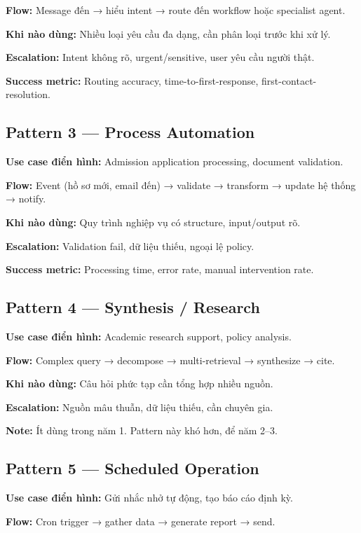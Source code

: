 \documentclass[11pt,a4paper]{article}
\begin{document}
\textbf{Flow:} Message đến → hiểu intent → route đến workflow hoặc specialist agent.

\textbf{Khi nào dùng:} Nhiều loại yêu cầu đa dạng, cần phân loại trước khi xử lý.

\textbf{Escalation:} Intent không rõ, urgent/sensitive, user yêu cầu người thật.

\textbf{Success metric:} Routing accuracy, time-to-first-response, first-contact-resolution.

\subsection{Pattern 3 — Process Automation}

\textbf{Use case điển hình:} Admission application processing, document validation.

\textbf{Flow:} Event (hồ sơ mới, email đến) → validate → transform → update hệ thống → notify.

\textbf{Khi nào dùng:} Quy trình nghiệp vụ có structure, input/output rõ.

\textbf{Escalation:} Validation fail, dữ liệu thiếu, ngoại lệ policy.

\textbf{Success metric:} Processing time, error rate, manual intervention rate.

\subsection{Pattern 4 — Synthesis / Research}

\textbf{Use case điển hình:} Academic research support, policy analysis.

\textbf{Flow:} Complex query → decompose → multi-retrieval → synthesize → cite.

\textbf{Khi nào dùng:} Câu hỏi phức tạp cần tổng hợp nhiều nguồn.

\textbf{Escalation:} Nguồn mâu thuẫn, dữ liệu thiếu, cần chuyên gia.

\textbf{Note:} Ít dùng trong năm 1. Pattern này khó hơn, để năm 2--3.

\subsection{Pattern 5 — Scheduled Operation}

\textbf{Use case điển hình:} Gửi nhắc nhở tự động, tạo báo cáo định kỳ.

\textbf{Flow:} Cron trigger → gather data → generate report → send.
\end{document}
